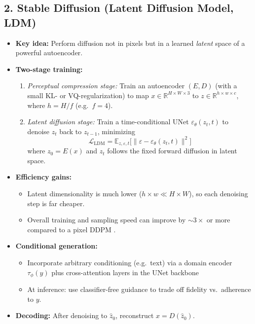 \subsection*{2. Stable Diffusion (Latent Diffusion Model, LDM)}
\begin{itemize}
  \item \textbf{Key idea:} Perform diffusion not in pixels but in a learned \emph{latent} space of a powerful autoencoder.  
  \item \textbf{Two-stage training:}
    \begin{enumerate}
      \item \emph{Perceptual compression stage:}  
        Train an autoencoder $(E,D)$ (with a small KL- or VQ-regularization) to map $x\!\in\!\mathbb{R}^{H\times W\times3}$ to $z\!\in\!\mathbb{R}^{h\times w\times c}$, where $h=H/f$ (e.g.\ $f=4$).
      \item \emph{Latent diffusion stage:}  
        Train a time-conditional UNet $\varepsilon_\theta(z_t,t)$ to denoise $z_t$ back to $z_{t-1}$, minimizing
        \[
          \mathcal{L}_{\mathrm{LDM}} 
          = \mathbb{E}_{z,\varepsilon,t}\bigl[\|\varepsilon - \varepsilon_\theta(z_t,t)\|^2\bigr]
        \]
        where $z_0=E(x)$ and $z_t$ follows the fixed forward diffusion in latent space.
    \end{enumerate}
  \item \textbf{Efficiency gains:}
    \begin{itemize}
      \item Latent dimensionality is much lower ($h\!\times\!w\!\ll\!H\!\times\!W$), so each denoising step is far cheaper.
      \item Overall training and sampling speed can improve by \(\sim\!3\times\) or more compared to a pixel DDPM .
    \end{itemize}
  \item \textbf{Conditional generation:}
    \begin{itemize}
      \item Incorporate arbitrary conditioning (e.g.\ text) via a domain encoder $\tau_\phi(y)$ plus cross-attention layers in the UNet backbone
      \item At inference: use classifier-free guidance to trade off fidelity vs.\ adherence to $y$.
    \end{itemize}
  \item \textbf{Decoding:} After denoising to $\hat z_0$, reconstruct $\hat x = D(\hat z_0)$.
\end{itemize}

